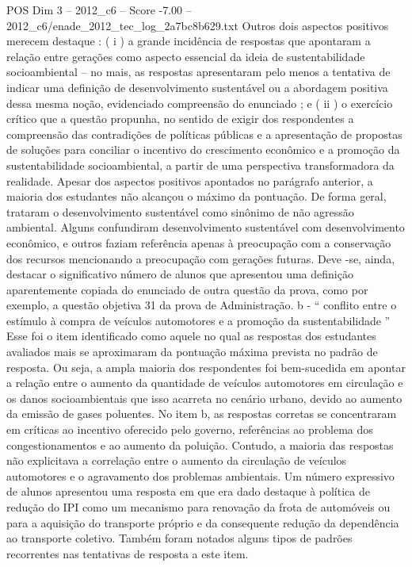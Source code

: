 \begin{textsample}{POS Dim 3 – 2012\_c6 – Score -7.00 – 2012\_c6/enade\_2012\_tec\_log\_2a7bc8b629.txt}
Outros dois aspectos positivos merecem destaque : ( i ) a grande incidência de respostas que apontaram a relação entre gerações como aspecto essencial da ideia de sustentabilidade socioambiental – no mais, as respostas apresentaram pelo menos a tentativa de indicar uma definição de desenvolvimento sustentável ou a abordagem positiva dessa mesma noção, evidenciado compreensão do enunciado ; e ( ii ) o exercício crítico que a questão propunha, no sentido de exigir dos respondentes a compreensão das contradições de políticas públicas e a apresentação de propostas de soluções para conciliar o incentivo do crescimento econômico e a promoção da sustentabilidade socioambiental, a partir de uma perspectiva transformadora da realidade.
Apesar dos aspectos positivos apontados no parágrafo anterior, a maioria dos estudantes não alcançou o máximo da pontuação.
De forma geral, trataram o desenvolvimento sustentável como sinônimo de não agressão ambiental.
Alguns confundiram desenvolvimento sustentável com desenvolvimento econômico, e outros faziam referência apenas à preocupação com a conservação dos recursos mencionando a preocupação com gerações futuras.
Deve -se, ainda, destacar o significativo número de alunos que apresentou uma definição aparentemente copiada do enunciado de outra questão da prova, como por exemplo, a questão objetiva 31 da prova de Administração. b - “ conflito entre o estímulo à compra de veículos automotores e a promoção da sustentabilidade ” Esse foi o item identificado como aquele no qual as respostas dos estudantes avaliados mais se aproximaram da pontuação máxima prevista no padrão de resposta.
Ou seja, a ampla maioria dos respondentes foi bem-sucedida em apontar a relação entre o aumento da quantidade de veículos automotores em circulação e os danos socioambientais que isso acarreta no cenário urbano, devido ao aumento da emissão de gases poluentes.
No item b, as respostas corretas se concentraram em críticas ao incentivo oferecido pelo governo, referências ao problema dos congestionamentos e ao aumento da poluição.
Contudo, a maioria das respostas não explicitava a correlação entre o aumento da circulação de veículos automotores e o agravamento dos problemas ambientais.
Um número expressivo de alunos apresentou uma resposta em que era dado destaque à política de redução do IPI como um mecanismo para renovação da frota de automóveis ou para a aquisição do transporte próprio e da consequente redução da dependência ao transporte coletivo.
Também foram notados alguns tipos de padrões recorrentes nas tentativas de resposta a este item.

\end{textsample}
